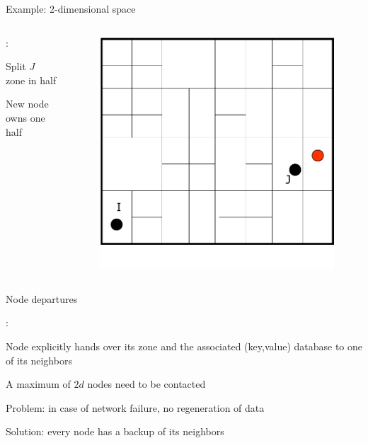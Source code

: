 \begin{frame}{Example: 2-dimensional space}

\begin{columns}
\begin{column}{0.5\textwidth}
:\\
\BE
\item Split $J$ zone in half
\item New node owns one half
\EE
\end{column}
\begin{column}{0.5\textwidth}
\begin{figure}
	\includegraphics[width=1.0\textwidth]{figs/10/can-join2}
\end{figure}
\end{column}
\end{columns}

\end{frame}

\begin{frame}{Node departures}

:
\BIL
\item Node explicitly hands over its zone and the associated (key,value) database to one of its neighbors
\item A maximum of $2d$ nodes need to be contacted
\item Problem: in case of network failure, no regeneration of data
\item Solution: every node has a backup of its neighbors 
\EIL
	
\end{frame}


